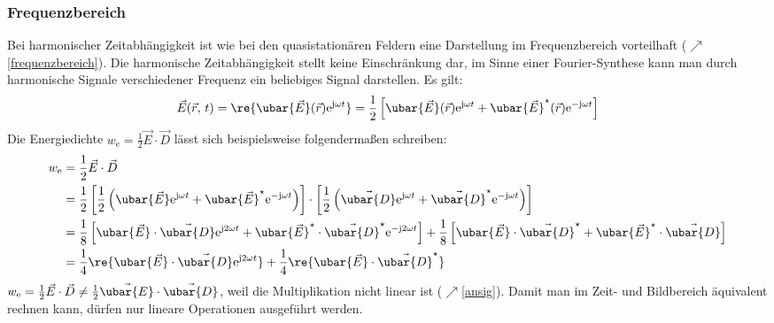   \subsubsection{Frequenzbereich}
  Bei harmonischer Zeitabhängigkeit ist wie bei den quasistationären Feldern eine Darstellung im Frequenzbereich vorteilhaft ($\nearrow$\ref{frequenzbereich}). Die harmonische Zeitabhängigkeit stellt keine Einschränkung dar, im Sinne einer Fourier-Synthese kann man durch harmonische Signale verschiedener Frequenz ein beliebiges Signal darstellen. Es gilt:		        \begin{equation}\begin{split}
				        \vec{E}(\vec{r} ,\,t) = \re{\ubar{\vec{E}}(\vec{r} )   \mathrm{e}^{\mathrm{j} \omega  t} } = \frac{1}{2} \left[\ubar{\vec{E}}(\vec{r} )   \mathrm{e}^{\mathrm{j} \omega  t}  + \ubar{\vec{E}}^\star(\vec{r} )   \mathrm{e}^{-\mathrm{j} \omega  t}  \right]
			        \end{split}\end{equation}
 Die Energiedichte $w_\text{e} = \frac{1}{2} \vec{E} \cdot \vec{D} $ lässt sich beispielsweise folgendermaßen schreiben:
		        \begin{equation}\begin{split}
				        w_\text{e} &= \frac{1}{2} \vec{E} \cdot \vec{D}  \\
				        &= \frac{1}{2} \left[ \frac{1}{2} \left(\ubar{\vec{E}}   \mathrm{e}^{\mathrm{j} \omega  t}  + \ubar{\vec{E}}^\star   \mathrm{e}^{-\mathrm{j} \omega  t}  \right)\right] \cdot \left[ \frac{1}{2} \left(\vec{\ubar{D}}   \mathrm{e}^{\mathrm{j} \omega  t}  + \vec{\ubar{D}}^\star   \mathrm{e}^{-\mathrm{j} \omega  t}  \right)  \right] \\
				        &= \frac{1}{8} \left[ \ubar{\vec{E}} \cdot \vec{\ubar{D}}   \mathrm{e}^{\mathrm{j} 2\omega  t} + \ubar{\vec{E}}^\star \cdot \vec{\ubar{D}}^\star   \mathrm{e}^{-\mathrm{j} 2\omega  t}\right] +  \frac{1}{8} \left[ \ubar{\vec{E}} \cdot \vec{\ubar{D}}^\star  + \ubar{\vec{E}}^\star \cdot \vec{\ubar{D}} \right]\\
				        &=\frac{1}{4}\re{\ubar{\vec{E}} \cdot \vec{\ubar{D}}   \mathrm{e}^{\mathrm{j} 2\omega  t}} + \frac{1}{4}\re{\ubar{\vec{E}} \cdot \vec{\ubar{D}}^\star}
			        \end{split}\end{equation}
		        $w_\text{e} = \frac{1}{2} \vec{E} \cdot \vec{D} \neq  \frac{1}{2} \vec{\ubar{E}} \cdot \vec{\ubar{D}}$, weil die Multiplikation nicht linear ist ($\nearrow$\ref{ansig}). Damit man im Zeit- und Bildbereich äquivalent rechnen kann, dürfen nur lineare Operationen ausgeführt werden.
